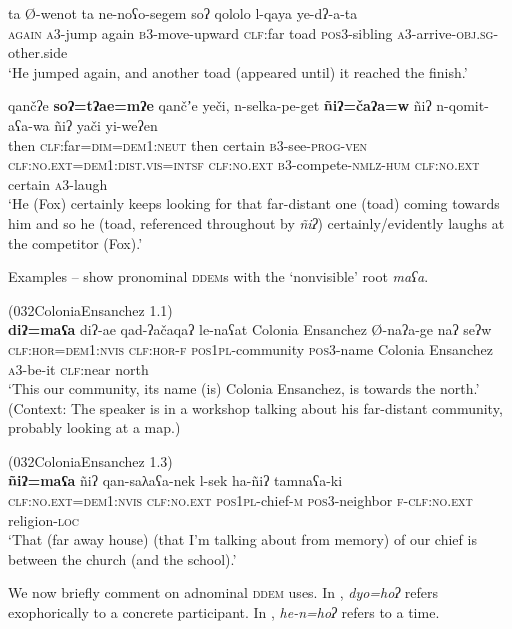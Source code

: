 \documentclass[output=paper,colorlinks,citecolor=brown]{langscibook}
\begin{document}
\ex\label{ex:payne:62c}
\gll ta  Ø-wenot  ta  ne-noʕo-segem  soʔ  qololo l-qaya  ye-dʔ-a-ta\\
  \textsc{again} \textsc{a3}-jump again \textsc{b3}-move-upward \textsc{clf}:far toad
\textsc{pos3}-sibling \textsc{a3}-arrive-\textsc{obj.sg}-other.side\\
\glt ‘He jumped again, and another toad (appeared until) it reached the finish.’

\ex\label{ex:payne:62d}
\gll qančʔe  \textbf{soʔ=tʔae=mʔe}  qančʼe  yeči, n-selka-pe-get  \textbf{ñiʔ=čaʔa=w}  ñiʔ n-qomit-aʕa-wa  ñiʔ  yači  yi-weʔen\\
  then \textsc{clf}:far\textsc{=dim}=\textsc{dem1:neut} then certain \textsc{b3}-see-\textsc{prog-ven}  \textsc{clf:no.ext=dem1:dist.vis=intsf}  \textsc{clf:no.ext} \textsc{b3}-compete-\textsc{nmlz-hum}  \textsc{clf:no.ext} certain \textsc{a3}-laugh\\
\glt ‘He (Fox) certainly keeps looking for that far-distant one (toad) coming towards him and so he (toad, referenced throughout by \textit{ñiʔ}) certainly/evidently laughs at the competitor (Fox).’ 
\z
\z

Examples – show pronominal \textsc{ddem}s with the ‘nonvisible’ root \textit{maʕa}.

\ea\label{ex:payne:63} (032ColoniaEnsanchez 1.1)\\
\gll  \textbf{diʔ=maʕa}  diʔ-ae  qad-ʔačaqaʔ le-naʕat  Colonia  Ensanchez Ø-naʔa-ge  naʔ  seʔw\\
\textsc{clf:hor=dem1:nvis}  \textsc{clf:hor-f}  \textsc{pos1pl}-community \textsc{pos3}-name  Colonia Ensanchez \textsc{a3}-be-it  \textsc{clf}:near  north\\
\glt ‘This our community, its name (is) Colonia Ensanchez, is towards the north.’ (Context: The speaker is in a workshop talking about his far-distant community, probably looking at a map.) 
\z

\ea\label{ex:payne:64} (032ColoniaEnsanchez 1.3)\\
\gll  \textbf{ñiʔ=maʕa}  ñiʔ  qan-saλaʕa-nek l-sek  ha-ñiʔ  tamnaʕa-ki\\
\textsc{clf:no.ext=dem1:nvis}  \textsc{clf:no.ext}  \textsc{pos1pl}-chief-\textsc{m}
\textsc{pos3}-neighbor  \textsc{f-clf:no.ext}  religion-\textsc{loc}  \\
\glt ‘That (far away house) (that I’m talking about from memory) of our chief is between the church (and the school).’ 
\z

We now briefly comment on adnominal \textsc{ddem} uses. In , \textit{dyo=hoʔ} refers exophorically to a concrete participant. In , \textit{he-n=hoʔ} refers to a time.
\end{document}

